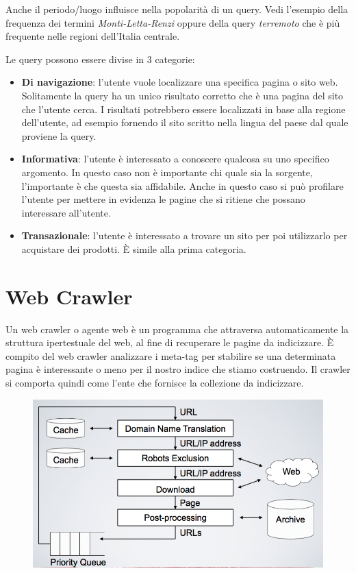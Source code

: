 Anche il periodo/luogo influisce nella popolarità di un query. Vedi l'esempio della frequenza dei termini \textit{Monti-Letta-Renzi} oppure della query \textit{terremoto} che è più frequente nelle regioni dell'Italia centrale.

Le query possono essere divise in 3 categorie:

\begin{itemize}
	\item \textbf{Di navigazione}: l'utente vuole localizzare una specifica pagina o sito web. Solitamente la query ha un unico risultato corretto che è una pagina del sito che l'utente cerca. I risultati potrebbero essere localizzati in base alla regione dell'utente, ad esempio fornendo il sito scritto nella lingua del paese dal quale proviene la query.
	\item \textbf{Informativa}: l'utente è interessato a conoscere qualcosa su uno specifico argomento. In questo caso non è importante chi quale sia la sorgente, l'importante è che questa sia affidabile. Anche in questo caso si può profilare l'utente per mettere in evidenza le pagine che si ritiene che possano interessare all'utente.
	\item \textbf{Transazionale}: l'utente è interessato a trovare un sito per poi utilizzarlo per acquistare dei prodotti. \`E simile alla prima categoria.
\end{itemize}

\section{Web Crawler}

Un web crawler o agente web è un programma che attraversa automaticamente la struttura ipertestuale del web, al fine di recuperare le pagine da indicizzare.
\`E compito del web crawler analizzare i meta-tag per stabilire se una determinata pagina è interessante o meno per il nostro indice che stiamo costruendo. Il crawler si comporta quindi come l'ente che fornisce la collezione da indicizzare.

\begin{figure}[htbp]
	\centering
	\includegraphics[width=.6\textwidth]{images/l18-fig-2.png}
\end{figure}


